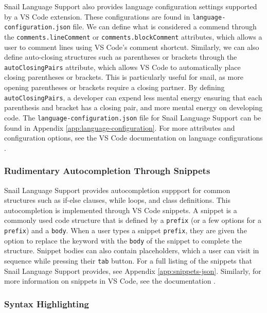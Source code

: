 \documentclass{article}
\begin{document}
Snail Language Support also provides language configuration settings supported by a VS Code extension. These configurations are found in \lstinline{language-configuration.json} file. We can define what is considered a commend through the \lstinline{comments.lineComment} or \lstinline{comments.blockComment} attributes, which allows a user to comment lines using VS Code's comment shortcut. Similarly, we can also define auto-closing structures such as parentheses or brackets through the \lstinline{autoClosingPairs} attribute, which allows VS Code to automatically place closing parentheses or brackets. This is particularly useful for snail, as more opening parentheses or brackets require a closing partner. By defining \lstinline{autoClosingPairs}, a developer can expend less mental energy ensuring that each parenthesis and bracket has a closing pair, and more mental energy on developing code. The \lstinline{language-configuration.json} file for Snail Language Support can be found in Appendix \ref{app:language-configuration}. For more attributes and configuration options, see the VS Code documentation on language configurations \cite{Microsoft_2023f}.

\subsubsection{Rudimentary Autocompletion Through Snippets}

Snail Language Support provides autocompletion suppport for common structures such as if-else clauses, while loops, and class definitions. This autocompletion is implemented through VS Code snippets. A snippet is a commonly used code structure that is defined by a \lstinline{prefix} (or a few options for a \lstinline{prefix}) and a \lstinline{body}. When a user types a snippet \lstinline{prefix}, they are given the option to replace the keyword with the \lstinline{body} of the snippet to complete the structure. Snippet bodies can also contain placeholders, which a user can visit in sequence while pressing their \lstinline{tab} button. For a full listing of the snippets that Snail Language Support provides, see Appendix \ref{app:snippets-json}. Similarly, for more information on snippets in VS Code, see the documentation \cite{Microsoft_2023g}.

\subsubsection{Syntax Highlighting}
\end{document}
